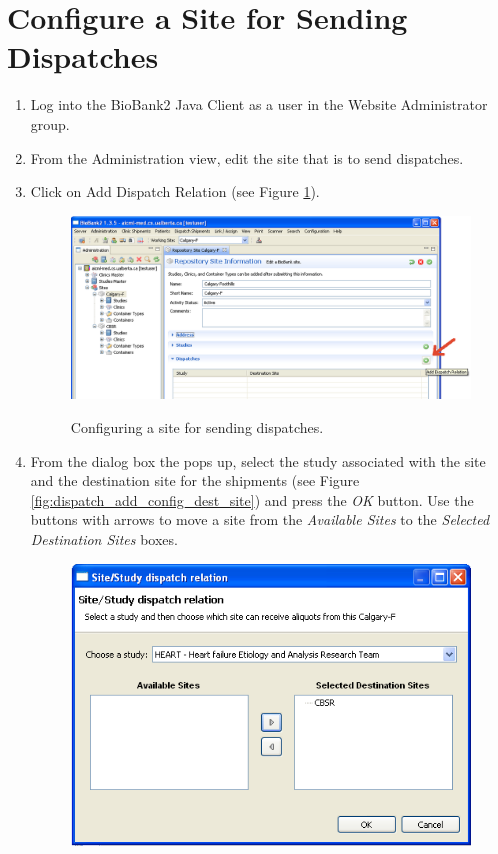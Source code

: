 \section{Configure a Site for Sending Dispatches}
\label{sec:config_send}
\begin{enumerate}
  \item Log into the BioBank2 Java Client as a user in the Website
    Administrator group.
  \item From the Administration view, edit the site that is to send dispatches.
  \item \label{add_dispatch} Click on Add Dispatch Relation (see Figure
    \ref{fig:dispatch_add_configuration}).
    \begin{figure}[H]
      \centering
      \scalebox{0.5}
      { \includegraphics*{screenshots/dispatch_add_configuration} }
      \caption{Configuring a site for sending dispatches.}
      \label{fig:dispatch_add_configuration}
    \end{figure}
  \item From the dialog box the pops up, select the study associated with the
    site and the destination site for the shipments (see Figure
    \ref{fig:dispatch_add_config_dest_site}) and press the \emph{OK}
    button. Use the buttons with arrows to move a site from the \emph{Available
      Sites} to the \emph{Selected Destination Sites} boxes.
    \begin{figure}[H]
      \centering
      \scalebox{0.5}
      { \includegraphics*{screenshots/dispatch_add_config_dest_site} }

\end{figure}
\end{enumerate}
